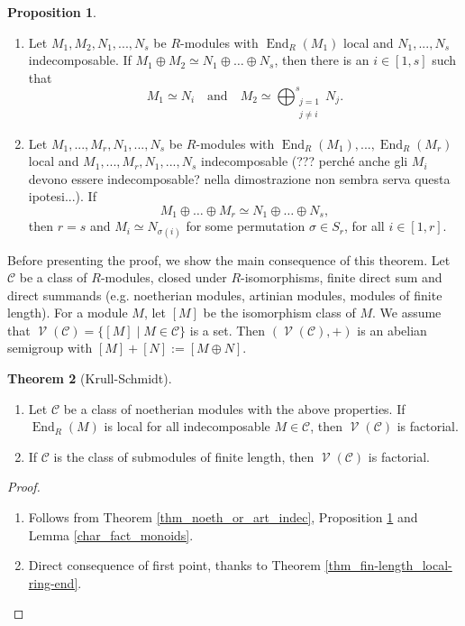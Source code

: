 \documentclass[12pt,a4paper]{report}
\theoremstyle{definition}
\newtheorem{theorem}{Theorem}[chapter] %
\newtheorem{proposition}[theorem]{Proposition}
\theoremstyle{num.custom-title}
\DeclareMathOperator{\End}{End}
\DeclareMathOperator{\V}{\mathcal{V}}
\begin{document}
\begin{proposition}\label{prop_unique_decomp}\ 
\begin{enumerate}
\item Let $M_1,M_2,N_1,...,N_s$ be $R$-modules with $\End_R(M_1)$ local and $N_1,...,N_s$ indecomposable. If $M_1 \oplus M_2 \simeq N_1 \oplus \ldots \oplus N_s$, then there is an $i \in [1,s]$ such that
\[
M_1 \simeq N_i \quad \text{and} \quad M_2 \simeq \bigoplus_{\substack{j=1 \\ j \neq i}}^s N_j.
\]
\item Let $M_1,...,M_r,N_1,...,N_s$ be $R$-modules with $\End_R(M_1),...,\End_R(M_r)$ local and $M_1,...,M_r,N_1,...,N_s$ indecomposable (??? perché anche gli $M_i$ devono essere indecomposable? nella dimostrazione non sembra serva questa ipotesi...). If 
\[
M_1 \oplus \ldots \oplus M_r \simeq N_1 \oplus \ldots \oplus N_s,
\]
then $r=s$ and $M_i \simeq N_{\sigma(i)}$ for some permutation $\sigma \in S_r$, for all $i \in [1,r]$.
\end{enumerate}
\end{proposition}

Before presenting the proof, we show the main consequence of this theorem. Let $\mathcal{C}$ be a class of $R$-modules, closed under $R$-isomorphisms, finite direct sum and direct summands (e.g. noetherian modules, artinian modules, modules of finite length). For a module $M$, let $[M]$ be the isomorphism class of $M$. We assume that $\V(\mathcal{C})=\{[M] \mid M \in \mathcal{C}\}$ is a set. Then $(\V(\mathcal{C}),+)$ is an abelian semigroup with $[M]+[N] := [M \oplus N]$.

\begin{theorem}[Krull-Schmidt]\ 
\begin{enumerate}
\item Let $\mathcal{C}$ be a class of noetherian modules with the above properties. If $\End_R(M)$ is local for all indecomposable $M \in \mathcal{C}$, then $\V(\mathcal{C})$ is factorial.
\item If $\mathcal{C}$ is the class of submodules of finite length, then $\V(\mathcal{C})$ is factorial.
\end{enumerate}
\begin{proof}\ 
\begin{enumerate}
\item Follows from Theorem \ref{thm_noeth_or_art_indec}, Proposition \ref{prop_unique_decomp} and Lemma \ref{char_fact_monoids}.
\item Direct consequence of first point, thanks to Theorem \ref{thm_fin-length_local-ring-end}.
\end{enumerate}
\end{proof}
\end{theorem}
\end{document}
